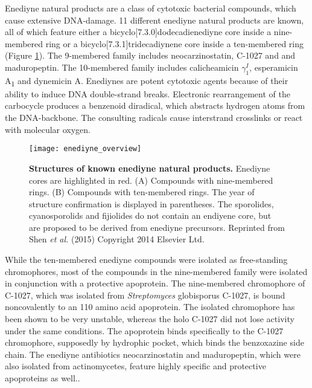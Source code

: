 	 Enediyne natural products are a class of cytotoxic bacterial compounds, which cause extensive DNA-damage.\autocite{Liang2010,Gredicak2007,AdrianL.Smith*1996,Nicolaou1993}
	 11 different enediyne natural products are known, all of which feature either a bicyclo[7.3.0]dodecadienediyne core inside a nine-membered ring or a bicyclo[7.3.1]tridecadiynene core inside a ten-membered ring (Figure \ref{fig:enediyne_comparison}).
	 The 9-membered family includes neocarzinostatin, C-1027 and and maduropeptin.
	 The 10-membered family includes calicheamicin $\gamma_{1}^{I}$, esperamicin A\textsubscript{1} and dynemicin A.\autocite{Liang2010}
	 Enediynes are potent cytotoxic agents because of their ability to induce DNA double-strand breaks.\autocite{Shen2015}
	 Electronic rearrangement of the carbocycle produces a benzenoid diradical, which abstracts hydrogen atoms from the DNA-backbone.
	 The consulting radicals cause interstrand crosslinks or react with molecular oxygen.	 
	 \begin{figure}[htbp]
	 	\centering
	 	\texttt{[image: enediyne\_overview]}
	 	\caption[Structures of known enediyne natural products]{%
	 		\textbf{Structures of known enediyne natural products.}
	 		Enediyne cores are highlighted in red.
	 		(A) Compounds with nine-membered rings.
	 		(B) Compounds with ten-membered rings.
	 		The year of structure confirmation is displayed in parentheses.
	 		The sporolides, cyanosporolids and fijiolides do not contain an endiyene core, but are proposed to be derived from enediyne precursors.
	 		Reprinted from Shen \textit{et al.} (2015) Copyright 2014 Elsevier Ltd.}
	 	\label{fig:enediyne_comparison}
	 \end{figure}
	 While the ten-membered enediyne compounds were isolated as free-standing chromophores, most of the compounds in the nine-membered family were isolated in conjunction with a protective apoprotein.\autocite{Liang2010}
	 The nine-membered chromophore of C-1027, which was isolated from \textit{Streptomyces} globisporus C-1027, is bound noncovalently to an 110 amino acid apoprotein.\autocite{AdrianL.Smith*1996,Minami1993,Yoshida1993,Otani1993,Sugiura1993,Matsumoto1993,Otani1991,Otani1988a,Matsumoto1993a}
	 The isolated chromophore has been shown to be very unstable, whereas the holo C-1027 did not lose activity under the same conditions.\autocite{Matsumoto1993,Sugiura1993,Otani1991}
	 The apoprotein binds specifically to the C-1027 chromophore, supposedly by hydrophic pocket, which binds the benzoxazine side chain.\autocite{Okuno1994,Matsumoto1993}
	 The enediyne antibiotics neocarzinostatin and maduropeptin, which were also isolated from actinomycetes, feature highly specific and protective apoproteins as well.\autocite{AdrianL.Smith*1996}.
	 
